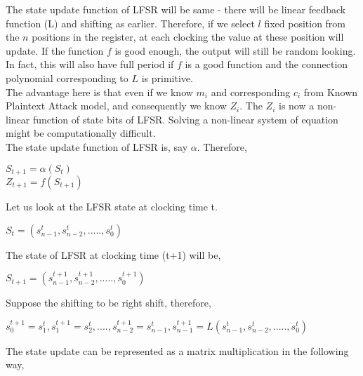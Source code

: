 \documentclass[11pt]{article}
\begin{document}
The state update function of LFSR will be same - there will be linear feedback function (L) and shifting as earlier. Therefore, if we select $l$ fixed position from the $n$ positions in the register, at each clocking the value at these position will update. If the function $f$ is good enough, the output will still be random looking. In fact, this will also have full period if $f$ is a good function and the connection polynomial corresponding to $L$ is primitive.\\
\newline
The advantage here is that even if we know $m_i$ and corresponding $c_i$ from Known Plaintext Attack model, and consequently we know $Z_i$. The $Z_i$ is now a non-linear function of state bits of LFSR. Solving a non-linear system of equation might be computationally difficult.\\
\newline
The state update function of LFSR is, say $\alpha$. Therefore, 
\begin{center}
    $S_{t+1} = \alpha(S_t)$\\
    $Z_{t+1} = f(S_{t+1})$
\end{center}
Let us look at the LFSR state at clocking time t.
\begin{center}
    $S_t = (s_{n-1}^t, s_{n-2}^t,....., s_0^t)$
\end{center}
The state of LFSR at clocking time (t+1) will be, 
\begin{center}
    $S_{t+1} = (s_{n-1}^{t+1}, s_{n-2}^{t+1},....., s_0^{t+1})$
\end{center}
Suppose the shifting to be right shift, therefore, 
\begin{center}
    $s_0^{t+1} = s_1^t, s_1^{t+1} = s_2^t,....,s_{n-2}^{t+1} = s_{n-1}^t, s_{n-1}^{t+1} = L(s_{n-1}^t, s_{n-2}^t,....., s_0^t)$
\end{center}
The state update can be represented as a matrix multiplication in the following way,
\end{document}
